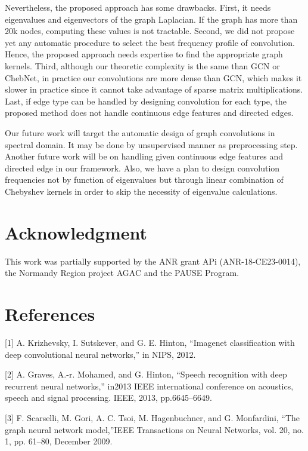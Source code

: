 \documentclass{article}
\begin{document}
Nevertheless, the proposed approach has some drawbacks. First, it needs eigenvalues and eigenvectors of the graph Laplacian. If the graph has more than 20k nodes, computing these values is not tractable. Second, we did not propose yet any automatic procedure to select the best frequency profile of convolution. Hence, the proposed approach needs expertise to find the appropriate graph kernels. Third, although our theoretic complexity is the same than GCN or ChebNet, in practice our convolutions are more dense than GCN, which makes it slower in practice since it cannot take advantage of sparse matrix multiplications. Last, if edge type can be handled by designing convolution for each type, the proposed method does not handle continuous edge features and directed edges. 

Our future work will target the automatic design of graph convolutions in spectral domain. It may be done by unsupervised manner as preprocessing step. Another future work will be on handling given continuous edge features and directed edge in our framework. Also, we have a plan to design convolution frequencies not by function of eigenvalues but through linear combination of Chebyshev kernels in order to skip the necessity of eigenvalue calculations. 

\section*{Acknowledgment}

This work was partially supported by the ANR grant APi (ANR-18-CE23-0014), the Normandy Region project AGAC and the PAUSE Program.
\bigskip

\section*{References}

\medskip

\small

[1] A. Krizhevsky, I. Sutskever, and G. E. Hinton, “Imagenet classification with deep convolutional neural networks,” in NIPS, 2012.

[2] A.  Graves,  A.-r.  Mohamed,  and  G.  Hinton,  “Speech  recognition with deep recurrent neural networks,” in2013 IEEE international conference on acoustics, speech and signal processing.    IEEE, 2013, pp.6645–6649.

[3] F. Scarselli, M. Gori, A. C. Tsoi, M. Hagenbuchner, and G. Monfardini, “The graph neural network model,”IEEE Transactions on Neural Networks, vol. 20, no. 1, pp. 61–80, December 2009.
\end{document}
